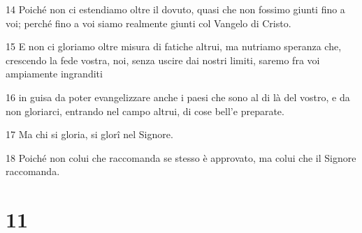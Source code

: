\par 14 Poiché non ci estendiamo oltre il dovuto, quasi che non fossimo giunti fino a voi; perché fino a voi siamo realmente giunti col Vangelo di Cristo.
\par 15 E non ci gloriamo oltre misura di fatiche altrui, ma nutriamo speranza che, crescendo la fede vostra, noi, senza uscire dai nostri limiti, saremo fra voi ampiamente ingranditi
\par 16 in guisa da poter evangelizzare anche i paesi che sono al di là del vostro, e da non gloriarci, entrando nel campo altrui, di cose bell'e preparate.
\par 17 Ma chi si gloria, si glorî nel Signore.
\par 18 Poiché non colui che raccomanda se stesso è approvato, ma colui che il Signore raccomanda.

\chapter{11}

